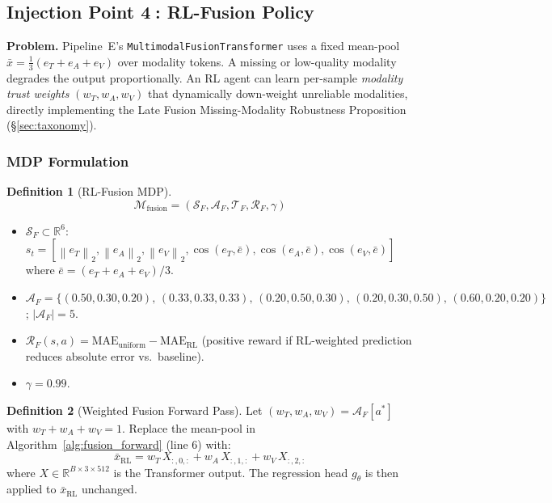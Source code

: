 \documentclass[12pt,a4paper]{article}
\theoremstyle{definition}
\newtheorem{definition}{Definition}[section]
\theoremstyle{plain}
\theoremstyle{remark}
\newcommand{\R}{\mathbb{R}}
\newcommand{\Norm}[1]{\left\|#1\right\|_2}
\begin{document}
\subsection{Injection Point \textcircled{4}: RL-Fusion Policy}
\label{sec:rl_fusion}

\begin{tcolorbox}[rlinjbox,title={Injection \textcircled{4} --- RL-Fusion}]
\textbf{Problem.}
Pipeline~E's \texttt{MultimodalFusionTransformer} uses a fixed mean-pool
$\bar{x} = \frac{1}{3}(e_T + e_A + e_V)$ over modality tokens.
A missing or low-quality modality degrades the output proportionally.
An RL agent can learn per-sample \emph{modality trust weights}
$(w_T, w_A, w_V)$ that dynamically down-weight unreliable modalities, directly
implementing the Late Fusion Missing-Modality Robustness Proposition
(\S\ref{sec:taxonomy}).
\end{tcolorbox}

\subsubsection{MDP Formulation}

\begin{definition}[RL-Fusion MDP]
\label{def:rl_fusion_mdp}
\[
  \mathcal{M}_{\text{fusion}} = (\mathcal{S}_F,\mathcal{A}_F,\mathcal{T}_F,\mathcal{R}_F,\gamma)
\]
\begin{itemize}[nosep]
  \item $\mathcal{S}_F \subset \R^6$:
        $s_t = [\Norm{e_T},\Norm{e_A},\Norm{e_V},
        \cos(e_T,\bar{e}),\cos(e_A,\bar{e}),\cos(e_V,\bar{e})]$
        where $\bar{e} = (e_T+e_A+e_V)/3$.
  \item $\mathcal{A}_F = \{(0.50,0.30,0.20),\,(0.33,0.33,0.33),\,
        (0.20,0.50,0.30),\,(0.20,0.30,0.50),\,(0.60,0.20,0.20)\}$;
        $|\mathcal{A}_F|=5$.
  \item $\mathcal{R}_F(s,a) = \text{MAE}_{\text{uniform}} - \text{MAE}_{\text{RL}}$
        (positive reward if RL-weighted prediction reduces absolute error vs.\ baseline).
  \item $\gamma = 0.99$.
\end{itemize}
\end{definition}

\begin{definition}[Weighted Fusion Forward Pass]
\label{def:weighted_fusion}
Let $(w_T, w_A, w_V) = \mathcal{A}_F[a^*]$ with $w_T + w_A + w_V = 1$.
Replace the mean-pool in Algorithm~\ref{alg:fusion_forward} (line 6) with:
\[
  \bar{x}_{\text{RL}} = w_T\,X_{:,0,:} + w_A\,X_{:,1,:} + w_V\,X_{:,2,:}
\]
where $X \in \R^{B \times 3 \times 512}$ is the Transformer output.
The regression head $g_\theta$ is then applied to $\bar{x}_{\text{RL}}$ unchanged.
\end{definition}
\end{document}
